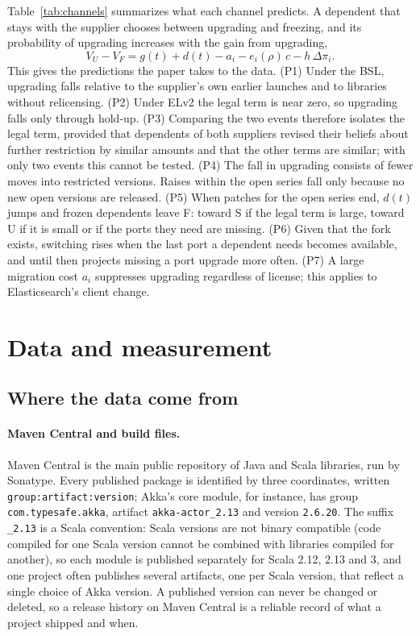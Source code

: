 \documentclass[11pt]{article}
\begin{document}
Table~\ref{tab:channels} summarizes what each channel predicts. A dependent that stays with the supplier chooses between upgrading and freezing, and its probability of upgrading increases with the gain from upgrading,
\[
V_U - V_F = g(t) + d(t) - a_i - e_i(\rho)\,c - h\,\Delta\pi_i .
\]
This gives the predictions the paper takes to the data. (P1) Under the BSL, upgrading falls relative to the supplier's own earlier launches and to libraries without relicensing. (P2) Under ELv2 the legal term is near zero, so upgrading falls only through hold-up. (P3) Comparing the two events therefore isolates the legal term, provided that dependents of both suppliers revised their beliefs about further restriction by similar amounts and that the other terms are similar; with only two events this cannot be tested. (P4) The fall in upgrading consists of fewer moves into restricted versions. Raises within the open series fall only because no new open versions are released. (P5) When patches for the open series end, $d(t)$ jumps and frozen dependents leave F: toward S if the legal term is large, toward U if it is small or if the ports they need are missing. (P6) Given that the fork exists, switching rises when the last port a dependent needs becomes available, and until then projects missing a port upgrade more often. (P7) A large migration cost $a_i$ suppresses upgrading regardless of license; this applies to Elasticsearch's client change.

\section{Data and measurement}\label{sec:data}

\subsection{Where the data come from}

\paragraph{Maven Central and build files.} Maven Central is the main public repository of Java and Scala libraries, run by Sonatype. Every published package is identified by three coordinates, written \texttt{group:artifact:version}; Akka's core module, for instance, has group \texttt{com.typesafe.akka}, artifact \texttt{akka-actor\_2.13} and version \texttt{2.6.20}. The suffix \texttt{\_2.13} is a Scala convention: Scala versions are not binary compatible (code compiled for one Scala version cannot be combined with libraries compiled for another), so each module is published separately for Scala 2.12, 2.13 and 3, and one project often publishes several artifacts, one per Scala version, that reflect a single choice of Akka version. A published version can never be changed or deleted, so a release history on Maven Central is a reliable record of what a project shipped and when.
\end{document}
